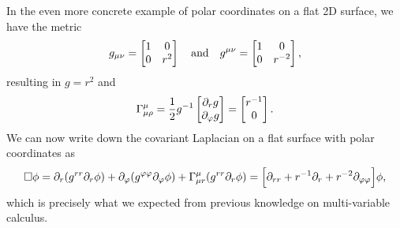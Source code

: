 \documentclass[11pt,a4paper, 
swedish, english %
]{article}
\begin{document}
In the even more concrete example of polar coordinates on a flat 2D
surface, we have the metric
\begin{equation}
g_{\mu\nu}=
\begin{bmatrix}
1&0\\
0&r^2
\end{bmatrix}
\qand
g^{\mu\nu}=
\begin{bmatrix}
1&0\\
0&r^{-2}
\end{bmatrix},
\end{equation}
resulting in $g=r^2$ and
\begin{equation}
\Gamma^\mu_{\mu\rho}=\frac{1}{2}g^{-1}
\begin{bmatrix}
\partial_r g\\\partial_\varphi g
\end{bmatrix}
=
\begin{bmatrix}
r^{-1}\\0
\end{bmatrix}.
\end{equation}
We can now write down the covariant Laplacian on a flat surface with
polar coordinates as
\begin{equation}
\Box\phi=\partial_r(g^{rr}\partial_r\phi)
+\partial_\varphi(g^{\varphi\varphi}\partial_\varphi\phi)
+\Gamma^{\mu}_{\mu r}(g^{rr}\partial_r\phi)
=\Big[\partial_{rr}+r^{-1}\partial_r+r^{-2}\partial_{\varphi\varphi}
\Big]\phi,
\end{equation}
which is precisely what we expected from previous knowledge on
multi-variable calculus. 
\end{document}
